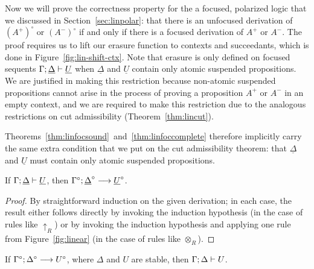 

Now we will prove the correctness property for the a focused,
polarized logic that we discussed in Section~\ref{sec:linpolar}: that
there is an unfocused derivation of $(A^+)^\circ$ or $(A^-)^\circ$ if
and only if there is a focused derivation of $A^+$ or $A^-$.  The
proof requires us to lift our erasure function to contexts and
succeedants, which is done in Figure~\ref{fig:lin-shift-ctx}. Note
that erasure is only defined on focused sequents
${\Gamma};{\underline{\Delta}} \vdash {\underline{U}} \mathstrut$ when
$\underline{\Delta}$ and $\underline{U}$ contain only atomic suspended
propositions. We are justified in making this restriction because
non-atomic suspended propositions cannot arise in the process of
proving a proposition $A^+$ or $A^-$ in an empty context, and we
are required to make this restriction due to the analogous restrictions
on cut admissibility (Theorem~\ref{thm:lincut}).

Theorems~\ref{thm:linfocsound}~and~\ref{thm:linfoccomplete} therefore
implicitly carry the same extra condition that we put on the cut
admissibility theorem: that $\underline{\Delta}$ and $\underline{U}$
must contain only atomic suspended propositions.

\bigskip
\begin{theorem}\label{thm:linfocsound}
If ${\Gamma};{\underline{\Delta}} \vdash {\underline{U}} \mathstrut$, 
then ${\Gamma^\circ};{\underline{\Delta}^\circ} \longrightarrow {\underline{U}^\circ} \mathstrut$.
\end{theorem}

\begin{proof}
  By straightforward induction on the given derivation; in each case,
  the result either follows directly by invoking the induction
  hypothesis (in the case of rules like ${\uparrow}_R$) or by invoking
  the induction hypothesis and applying one rule from
  Figure~\ref{fig:linear} (in the case of rules like ${\otimes}_R$).
\end{proof}

\begin{theorem}\label{thm:linfoccomplete}
If ${\Gamma^\circ};{\Delta^\circ} \longrightarrow {U^\circ} \mathstrut$, where $\Delta$ and $U$ are
stable,
then ${\Gamma};{\Delta} \vdash {U} \mathstrut$. 
\end{theorem}

